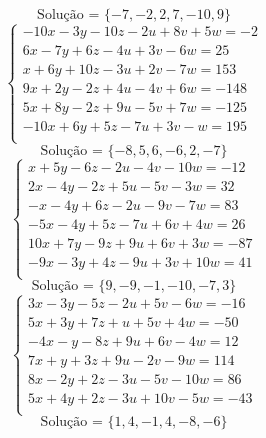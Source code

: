 \documentclass[12pt,oneside,a4paper]{article}
\begin{document}
\begin{equation*}
\text{Solução = }\{-7,-2,2,7,-10,9\}
\end{equation*}
\vspace{\baselineskip}
\begin{equation*}
\begin{cases}
-10x-3y-10z-2u+8v+5w=-2 \\
6x-7y+6z-4u+3v-6w=25 \\
x+6y+10z-3u+2v-7w=153 \\
9x+2y-2z+4u-4v+6w=-148 \\
5x+8y-2z+9u-5v+7w=-125 \\
-10x+6y+5z-7u+3v-w=195 \\
\end{cases}
\end{equation*}
\begin{equation*}
\text{Solução = }\{-8,5,6,-6,2,-7\}
\end{equation*}
\vspace{\baselineskip}
\begin{equation*}
\begin{cases}
x+5y-6z-2u-4v-10w=-12 \\
2x-4y-2z+5u-5v-3w=32 \\
-x-4y+6z-2u-9v-7w=83 \\
-5x-4y+5z-7u+6v+4w=26 \\
10x+7y-9z+9u+6v+3w=-87 \\
-9x-3y+4z-9u+3v+10w=41 \\
\end{cases}
\end{equation*}
\begin{equation*}
\text{Solução = }\{9,-9,-1,-10,-7,3\}
\end{equation*}
\vspace{\baselineskip}
\begin{equation*}
\begin{cases}
3x-3y-5z-2u+5v-6w=-16 \\
5x+3y+7z+u+5v+4w=-50 \\
-4x-y-8z+9u+6v-4w=12 \\
7x+y+3z+9u-2v-9w=114 \\
8x-2y+2z-3u-5v-10w=86 \\
5x+4y+2z-3u+10v-5w=-43 \\
\end{cases}
\end{equation*}
\begin{equation*}
\text{Solução = }\{1,4,-1,4,-8,-6\}
\end{equation*}
\end{document}
